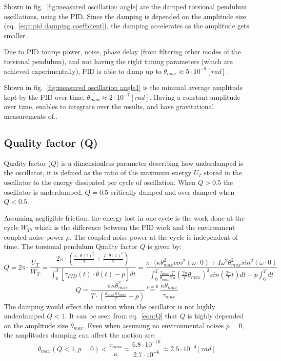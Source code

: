 \documentclass[\main/master.tex]{subfiles}
\begin{document}
Shown in fig.~\ref{fig:measured oscillation angle} are the damped torsional pendulum oscillations, using the PID. Since the damping is depended on the amplitude size (eq.~\ref{eqn:pid damping coefficient}), the damping accelerates as the amplitude gets smaller. 
\par\noindent
Due to PID tourqe power, noise, phase delay (from filtering other modes of the torsional pendulum), and not having the right tuning parameters (which are achieved experimentally), PID is able to damp up to $\theta_{max}\approx 5\cdot 10^{-8}[rad]$.
\par\noindent
Shown in fig.~\ref{fig:measured oscillation angle1} is the minimal average amplitude kept by the PID over time, $\overline{\theta_{max}}\approx 2\cdot 10^{-7}[rad]$. Having a constant amplitude over time, enables to integrate over the results, and have gravitational measurements of..
\par\noindent
\subsection{Quality factor (Q)}
Quality factor ($Q$) is a dimensionless parameter describing how underdamped is the oscillator, it is defined as the ratio of the maximum energy $U_T$ stored in the oscillator to the energy dissipated per cycle of oscillation. When $Q > 0.5$ the oscillator is underdamped, $Q = 0.5$ critically damped and over damped when $Q < 0.5$.
\par\noindent
Assuming negligible friction, the energy lost in one cycle is the work done at the cycle $W_T$, which is the difference between the PID work and the environment coupled noise power $p$. The coupled noise power at the cycle is independent of time. The torsional pendulum Quality factor $Q$ is given by:
\begin{equation}
Q = 2\pi\cdot \frac{U_T}{W_T}=  \frac{2\pi\cdot(\frac{\kappa\cdot\theta(t)^2}{2}+\frac{I\cdot\dot{\theta}(t)^2}{2})}{\int_0^T[\tau_{PID}(t)\cdot\dot{\theta}(t) - p]dt} =  \frac{\pi\cdot(\kappa\theta_{max}^2cos^2(\omega\cdot 0)+I\omega^2\theta_{max}^2sin^2(\omega\cdot 0) }{\int_0^T\frac{\tau_{max} }{\theta_{max}} \frac{ T}{2\pi}(\frac{2\pi}{T}\theta_{max})^2 sin(\frac{2\pi}{T}t)dt-p\int_0^T dt }
\label{eqn:Q}
\end{equation}
\begin{equation}
Q =  \frac{\pi\kappa\theta_{max}^2}{T\cdot(\frac{\theta_{max}\pi\tau_{max}}{T} -p)} \stackrel{p= 0}{=} \frac{\kappa\theta_{max}}{\tau_{max}}
\label{eqn:Q}
\end{equation}
The damping would effect the motion when the oscillator is not highly underdamped $Q < 1$. It can be seen from eq.~\ref{eqn:Q} that $Q$ is highly depended on the amplitude size $\theta_{max}$. Even when assuming no environmental noises $p=0$, the amplitudes damping can affect the motion are:  
\begin{equation}
\theta_{max}(Q<1,p=0) < \frac{\tau_{max}}{\kappa} \approx \frac{6.8\cdot 10^{-10}}{2.7\cdot 10^{-6}} \approx 2.5\cdot 10^{-4} [rad]
\label{eqn:low Q}
\end{equation}
\end{document}
